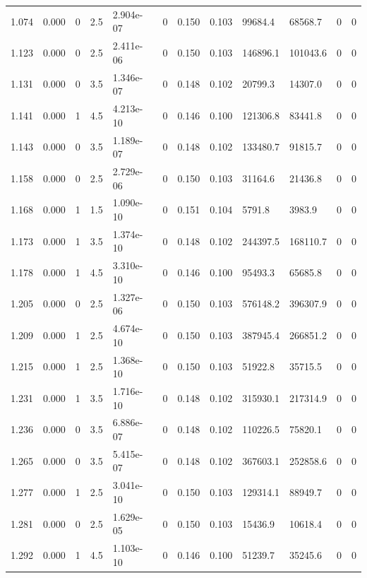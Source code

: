 \documentclass[preview]{standalone}
\begin{document}
{{{\begin{tabular}{L{1.2cm}C{1.2cm} C{0.3cm}C{0.5cm} C{1.4cm}C{1.4cm} C{1.4cm}C{1.4cm} C{1.6cm}C{1.6cm} C{1.6cm}C{1.6cm}}
  1.074  &  0.000  & 0     & 2.5 &  2.904e-07  & 0  &  0.150&   0.103& 99684.4 & 68568.7   &  0 & 0  \\ 
  1.123  &  0.000  & 0     & 2.5 &  2.411e-06  & 0  &  0.150&   0.103& 146896.1 & 101043.6   &  0 & 0  \\ 
  1.131  &  0.000  & 0     & 3.5 &  1.346e-07  & 0  &  0.148&   0.102& 20799.3 & 14307.0   &  0 & 0  \\ 
  1.141  &  0.000  & 1     & 4.5 &  4.213e-10  & 0  &  0.146&   0.100& 121306.8 & 83441.8   &  0 & 0  \\ 
  1.143  &  0.000  & 0     & 3.5 &  1.189e-07  & 0  &  0.148&   0.102& 133480.7 & 91815.7   &  0 & 0  \\ 
  1.158  &  0.000  & 0     & 2.5 &  2.729e-06  & 0  &  0.150&   0.103& 31164.6 & 21436.8   &  0 & 0  \\ 
  1.168  &  0.000  & 1     & 1.5 &  1.090e-10  & 0  &  0.151&   0.104& 5791.8 & 3983.9   &  0 & 0  \\ 
  1.173  &  0.000  & 1     & 3.5 &  1.374e-10  & 0  &  0.148&   0.102& 244397.5 & 168110.7   &  0 & 0  \\ 
  1.178  &  0.000  & 1     & 4.5 &  3.310e-10  & 0  &  0.146&   0.100& 95493.3 & 65685.8   &  0 & 0  \\ 
  1.205  &  0.000  & 0     & 2.5 &  1.327e-06  & 0  &  0.150&   0.103& 576148.2 & 396307.9   &  0 & 0  \\ 
  1.209  &  0.000  & 1     & 2.5 &  4.674e-10  & 0  &  0.150&   0.103& 387945.4 & 266851.2   &  0 & 0  \\ 
  1.215  &  0.000  & 1     & 2.5 &  1.368e-10  & 0  &  0.150&   0.103& 51922.8 & 35715.5   &  0 & 0  \\ 
  1.231  &  0.000  & 1     & 3.5 &  1.716e-10  & 0  &  0.148&   0.102& 315930.1 & 217314.9   &  0 & 0  \\ 
  1.236  &  0.000  & 0     & 3.5 &  6.886e-07  & 0  &  0.148&   0.102& 110226.5 & 75820.1   &  0 & 0  \\ 
  1.265  &  0.000  & 0     & 3.5 &  5.415e-07  & 0  &  0.148&   0.102& 367603.1 & 252858.6   &  0 & 0  \\ 
  1.277  &  0.000  & 1     & 2.5 &  3.041e-10  & 0  &  0.150&   0.103& 129314.1 & 88949.7   &  0 & 0  \\ 
  1.281  &  0.000  & 0     & 2.5 &  1.629e-05  & 0  &  0.150&   0.103& 15436.9 & 10618.4   &  0 & 0  \\ 
  1.292  &  0.000  & 1     & 4.5 &  1.103e-10  & 0  &  0.146&   0.100& 51239.7 & 35245.6   &  0 & 0  \\ 

\end{tabular}}}}
\end{document}
